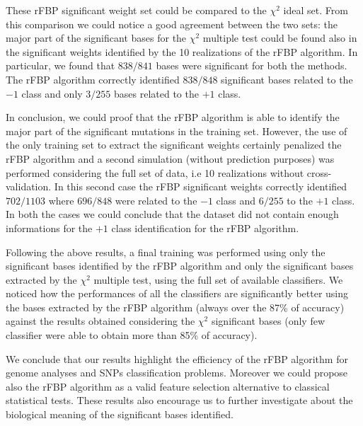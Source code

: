 \documentclass{standalone}
\begin{document}
These rFBP significant weight set could be compared to the $\chi^2$ ideal set.
From this comparison we could notice a good agreement between the two sets: the major part of the significant bases for the $\chi^2$ multiple test could be found also in the significant weights identified by the 10 realizations of the rFBP algorithm.
In particular, we found that $838/841$ bases were significant for both the methods.
The rFBP algorithm correctly identified $838/848$ significant bases related to the $-1$ class and only $3/255$ bases related to the $+1$ class.

In conclusion, we could proof that the rFBP algorithm is able to identify the major part of the significant mutations in the training set.
However, the use of the only training set to extract the significant weights certainly penalized the rFBP algorithm and a second simulation (without prediction purposes) was performed considering the full set of data, i.e 10 realizations without cross-validation.
In this second case the rFBP significant weights correctly identified $702/1103$ where $696/848$ were related to the $-1$ class and $6/255$ to the $+1$ class.
In both the cases we could conclude that the dataset did not contain enough informations for the $+1$ class identification for the rFBP algorithm.

Following the above results, a final training was performed using only the significant bases identified by the rFBP algorithm and only the significant bases extracted by the $\chi^2$ multiple test, using the full set of available classifiers.
We noticed how the performances of all the classifiers are significantly better using the bases extracted by the rFBP algorithm (always over the 87\% of accuracy) against the results obtained considering the $\chi^2$ significant bases (only few classifier were able to obtain more than 85\% of accuracy).

We conclude that our results highlight the efficiency of the rFBP algorithm for genome analyses and SNPs classification problems.
Moreover we could propose also the rFBP algorithm as a valid feature selection alternative to classical statistical tests.
These results also encourage us to further investigate about the biological meaning of the significant bases identified.
\end{document}

